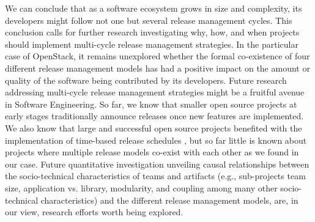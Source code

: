 \documentclass[dvipsnames]{interact}
\theoremstyle{plain}\newtheorem{theorem}{Theorem}[section]
\theoremstyle{definition}
\theoremstyle{remark}
\begin{document}
We can conclude that as a software ecosystem grows in size and complexity, its developers might follow not one but several release management cycles. This conclusion calls for further research investigating why, how, and when projects should implement multi-cycle release management strategies. In the particular case of OpenStack, it remains unexplored whether the formal co-existence of four different release management models has had a positive impact on the amount or quality of the software being contributed by its developers. Future research addressing multi-cycle release management strategies might be a fruitful avenue in Software Engineering. So far, we know that smaller open source projects at early stages traditionally announce releases once new features are implemented. We also know that large and successful open source projects benefited with the implementation of time-based release schedules \citep{MichlmayrFitzgerald_et_al2015}, but so far little is known about projects where multiple release models co-exist with each other as we found in our case. Future quantitative investigation unveiling causal relationships between the socio-technical characteristics of teams and artifacts (e.g., sub-projects team size, application vs. library, modularity, and coupling among many other socio-technical characteristics) and the different release management models, are,  in our view, research efforts worth being explored.                                                                                                                                                                                                                                                                                                                                                                                                                                                                                                                                                                                                                                                                                                                                                                                                                                                                                                                                                                                                                                                                                                                                                                                                                                                                                                                                                                                                                                                                                                                                                                                                                                                                                                                                                                                                                                                                                                                                                                        
\end{document}
